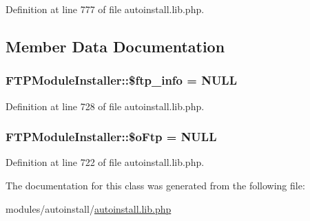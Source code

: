 Definition at line 777 of file autoinstall.\-lib.\-php.



\subsection{Member Data Documentation}
\hypertarget{classFTPModuleInstaller_afd92e3672f27df9d0056f759cfb4206c}{
\subsubsection[{\$ftp\-\_\-info}]{\setlength{\rightskip}{0pt plus 5cm}F\-T\-P\-Module\-Installer\-::\$ftp\-\_\-info = N\-U\-L\-L}}\label{classFTPModuleInstaller_afd92e3672f27df9d0056f759cfb4206c}


Definition at line 728 of file autoinstall.\-lib.\-php.

\hypertarget{classFTPModuleInstaller_a7df6cf65240fbb39a7d763e10b236dc9}{
\subsubsection[{\$o\-Ftp}]{\setlength{\rightskip}{0pt plus 5cm}F\-T\-P\-Module\-Installer\-::\$o\-Ftp = N\-U\-L\-L}}\label{classFTPModuleInstaller_a7df6cf65240fbb39a7d763e10b236dc9}


Definition at line 722 of file autoinstall.\-lib.\-php.



The documentation for this class was generated from the following file\-:\begin{DoxyCompactItemize}
\item 
modules/autoinstall/\hyperlink{autoinstall_8lib_8php}{autoinstall.\-lib.\-php}\end{DoxyCompactItemize}
